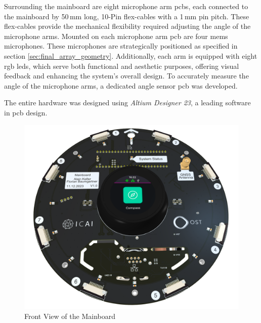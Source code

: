 Surrounding the mainboard are eight microphone arm \acrshort{pcb}s, each connected to the mainboard by 50\,mm long, 10-Pin flex-cables with a 1\,mm pin pitch.
These flex-cables provide the mechanical flexibility required adjusting the angle of the microphone arms.
Mounted on each microphone arm \acrshort{pcb} are four \acrshort{mems} microphones.
These microphones are strategically positioned as specified in section \ref{sec:final_array_geometry}.
Additionally, each arm is equipped with eight \acrshort{rgb} \acrshort{led}s, which serve both functional and aesthetic purposes, offering visual feedback and enhancing the system's overall design.
To accurately measure the angle of the microphone arms, a dedicated angle sensor \acrshort{pcb} was developed.

The entire hardware was designed using \textit{Altium Designer 23}, a leading software in \acrshort{pcb} design.
\begin{figure}[h!]
	\centering
	\vspace{0.3cm}
	\includegraphics[width=1.0\textwidth]{images/6_design_final/Mainboard_Front_Display.png}
	\caption{Front View of the Mainboard}
	\label{fig:mainboard_front}
\end{figure}
\newpage

